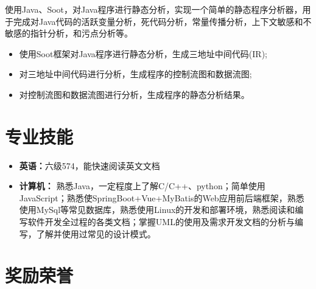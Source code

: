 \documentclass{resume}
\begin{document}

\Contents
{使用Java、Soot，对Java程序进行静态分析，实现一个简单的静态程序分析器，用于完成对Java代码的活跃变量分析，死代码分析，常量传播分析，上下文敏感和不敏感的指针分析，和污点分析等。}
{\begin{itemize}
    \item 使用Soot框架对Java程序进行静态分析，生成三地址中间代码(IR);
    \item 对三地址中间代码进行分析，生成程序的控制流图和数据流图;
    \item 对控制流图和数据流图进行分析，生成程序的静态分析结果。
\end{itemize} }
\sepspace

\section{专业技能}
\begin{itemize}
    \item \textbf{英语：}{六级574，能快速阅读英文文档}
    \item \textbf{计算机：}
    {熟悉Java，一定程度上了解C/C++、python；简单使用JavaScript；熟悉使SpringBoot+Vue+MyBatis的Web应用前后端框架，熟悉使用MySql等常见数据库，熟悉使用Linux的开发和部署环境，熟悉阅读和编写软件开发全过程的各类文档；掌握UML的使用及需求开发文档的分析与编写，了解并使用过常见的设计模式。}
\end{itemize}
\sepspace

\section{奖励荣誉}
\end{document}
